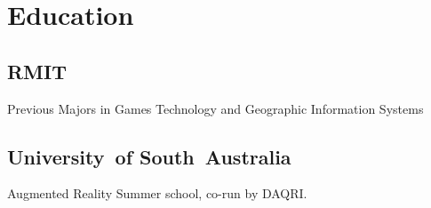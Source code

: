 \documentclass[a4paper]{deedy-resume_twopage} %
\begin{document}
%
\begin{minipage}[t]{0.25\textwidth} %


  \section{Education}

  \subsection{RMIT}

  Previous Majors in Games Technology and Geographic Information Systems \\

  \sectionspace %

  \subsection{University\hbox{ }of South~Australia}


  Augmented Reality Summer school, co-run by DAQRI. \\

  \sectionspace %




\end{minipage}
\end{document}
